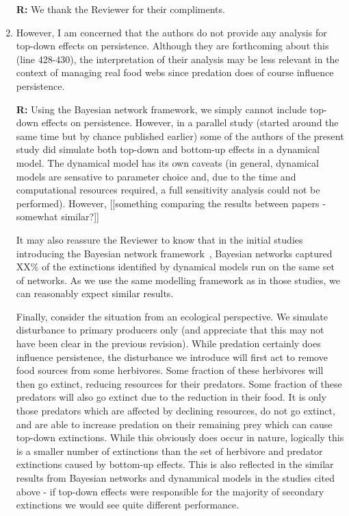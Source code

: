 \documentclass[12pt]{article}
\begin{document}
\begin{enumerate}
                \textbf{R:} We thank the Reviewer for their compliments.


            \item However, I am concerned that the authors do not provide any analysis for top-down effects on persistence. Although they are forthcoming about this (line 428-430), the interpretation of their analysis may be less relevant in the context of managing real food webs since predation does of course influence persistence.

                \textbf{R:} Using the Bayesian network framework, we simply cannot include top-down effects on persistence. However, in a parallel study (started around the same time but by chance published earlier) some of the authors of the present study did simulate both top-down and bottom-up effects in a dynamical model. The dynamical model has its own caveats (in general, dynamical models are sensative to parameter choice and, due to the time and computational resources required, a full sensitivity analysis could not be performed). However, [[something comparing the results between papers - somewhat similar?]]


                It may also reassure the Reviewer to know that in the initial studies introducing the Bayesian network framework~\citep{}, Bayesian networks captured XX\% of the extinctions identified by dynamical models run on the same set of networks. As we use the same modelling framework as in those studies, we can reasonably expect similar results.


                Finally, consider the situation from an ecological perspective. We simulate disturbance to primary producers only (and appreciate that this may not have been clear in the previous revision). While predation certainly does influence persistence, the disturbance we introduce will first act to remove food sources from some herbivores. Some fraction of these herbivores will then go extinct, reducing resources for their predators. Some fraction of these predators will also go extinct due to the reduction in their food. It is only those predators which are affected by declining resources, do not go extinct, and are able to increase predation on their remaining prey which can cause top-down extinctions. While this obviously does occur in nature, logically this is a smaller number of extinctions than the set of herbivore and predator extinctions caused by bottom-up effects. This is also reflected in the similar results from Bayesian networks and dynammical models in the studies cited above - if top-down effects were responsible for the majority of secondary extinctions we would see quite different performance.



\end{enumerate}
\end{document}

